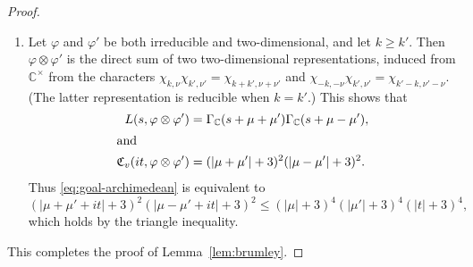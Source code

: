 \documentclass[12pt,reqno]{amsart}
\theoremstyle{remark}
\numberwithin{equation}{section}
\begin{document}
\begin{appendices}
\begin{proof}
\begin{enumerate}
        \item Let $\varphi$ and $\varphi'$ be both irreducible and two-dimensional, and let $k \ge k'$. Then $\varphi \otimes \varphi'$ is the direct sum of two two-dimensional representations, induced from $\mathbb{C}^{\times}$ from the characters $\chi_{k,\nu}\chi_{k',\nu'} = \chi_{k+k',\nu+\nu'}$ and $\chi_{-k,-\nu}\chi_{k',\nu'} = \chi_{k'-k,\nu'-\nu}$. (The latter representation is reducible when $k=k'$.) This shows that 
            \begin{align*}
                L(s, \varphi \otimes \varphi') &= \Gamma_{\mathbb{C}}(s+\mu+\mu')\Gamma_{\mathbb{C}}(s+\mu-\mu'),\\ 
                \intertext{and}
                \mathfrak{C}_v(it, \varphi \otimes \varphi') &= (|\mu+\mu'|+3)^2(|\mu-\mu'|+3)^2.
            \end{align*}
        Thus \eqref{eq:goal-archimedean} is equivalent to 
        \[
        (|\mu+\mu'+it|+3)^2(|\mu-\mu'+it|+3)^2 \le (|\mu|+3)^4(|\mu'|+3)^4(|t|+3)^4,
        \]
        which holds by the triangle inequality.
    \end{enumerate}
    This completes the proof of Lemma~\ref{lem:brumley}.
    \end{proof}
\end{appendices}



\end{document}
